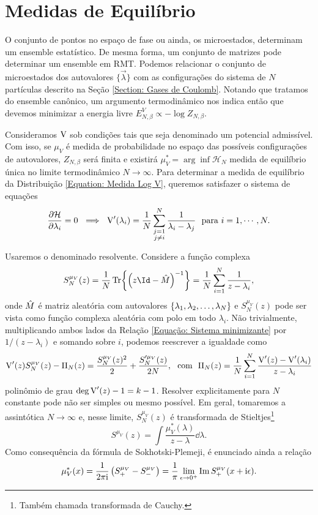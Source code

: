 \section{Medidas de Equilíbrio}
\label{Seção: Medida}
O conjunto de pontos no espaço de fase ou ainda, os microestados, determinam um ensemble estatístico. De mesma forma, um conjunto de matrizes pode determinar um ensemble em RMT. Podemos relacionar o conjunto de microestados dos autovalores $\{\vec{\lambda}\}$ com as configurações do sistema de $N$ partículas descrito na Seção \ref{Section: Gases de Coulomb}. Notando que tratamos do ensemble canônico, um argumento termodinâmico nos indica então que devemos minimizar a energia livre $E^V_{N,\beta} \propto - \log{Z_{N, \beta}}.$

Consideramos $\operatorname{V}$ sob condições tais que seja denominado um potencial admissível. \cite{ChafaCoulombMeasure} Com isso, se $\mu_{V}$ é medida de probabilidade no espaço das possíveis configurações de autovalores, $Z_{N, \beta}$ será finita e existirá $\mu_{V}^* = \arg \inf {\mathcal{H}_N}$ medida de equilíbrio única no limite termodinâmico $N \rightarrow \infty$. Para determinar a medida de equilíbrio da Distribuição \eqref{Equation: Medida Log V}, \cite{RMT-firstcourse-Potters} queremos satisfazer o sistema de equações
\begin{equation}
	\frac{\partial \mathcal{H}}{\partial \lambda_i} = 0 \ \implies \ \operatorname{V}'(\lambda_i) = \frac{1}{N} \sum_{\substack{j=1 \\ j \neq i}}^{N} \frac{1}{\lambda_i - \lambda_j} \ \ \text{para} \ i = 1, \cdots, N.
	\label{Equação: Sistema minimizante}
\end{equation} 

Usaremos o denominado resolvente. Considere a função complexa $$S^{\mu_V}_N(z) = \frac{1}{N} \Tr{\left(z\Id - \matriz{M}\right)^{-1}} = \frac{1}{N} \sum_{i=1}^{N} \frac{1}{z - \lambda_i},$$ onde $\hat M$ é matriz aleatória com autovalores $\{\lambda_1, \lambda_2, \dots, \lambda_N\}$ e $S^{\mu_V}_N(z)$ pode ser vista como função complexa aleatória com polo em todo $\lambda_i$. Não trivialmente, multiplicando ambos lados da Relação \eqref{Equação: Sistema minimizante} por $1/(z-\lambda_i)$ e somando sobre $i$, podemos reescrever a igualdade como $$\operatorname{V}'(z) S^{\mu_V}_N(z) - \Pi_N(z) = \frac{S^{\mu_V}_N (z)^2}{2} + \frac{S'^{\mu_V}_N(z)}{2N}, \ \ \text{com}\ \  \Pi_N(z) = \frac{1}{N} \sum_{i = 1}^{N} \frac{\operatorname{V}'(z) - \operatorname{V}'(\lambda_i)}{z - \lambda_i}$$ polinômio de grau $\deg{\operatorname{V}'(z)} - 1 = k - 1$. Resolver explicitamente para $N$ constante pode não ser simples ou mesmo possível. Em geral, tomaremos a assintótica $N \to \infty$ e, nesse limite, $S^{\mu_V}_N(z)$ é transformada de Stieltjes\footnote{Também chamada transformada de Cauchy.} $$S^{\mu_V}(z) = \int \frac{\mu^*_V(\lambda)}{z - \lambda} \dd \lambda.$$ Como consequência da fórmula de Sokhotski-Plemeji, é enunciado ainda a relação 
\begin{equation}
	\mu^{*}_{V}(x) = \frac{1}{2\pi \mathrm{i}} \left( S^{\mu_V}_{+} -  S^{\mu_V}_{-}\right) = \frac{1}{\pi} \lim_{\epsilon \to 0^+} \operatorname{Im}{S^{\mu_V}_{+}(x + \mathrm{i}\epsilon)}.
	\label{Equation: p(lambda)}
\end{equation} 

